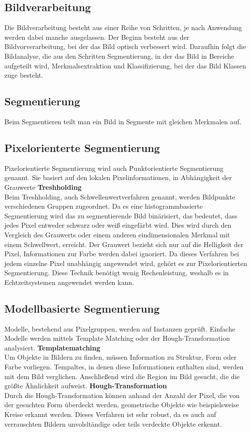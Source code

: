     \subsection*{Bildverarbeitung} 
    Die Bildverarbeitung besteht aus einer Reihe von Schritten, je nach Anwendung werden dabei manche ausgelassen.
    Der Beginn besteht aus der Bildvorverarbeitung, bei der das Bild optisch verbessert wird. Daraufhin folgt die Bildanalyse, die aus den Schritten Segmentierung, in der das Bild in Bereiche aufgeteilt wird, Merkmalsextraktion und Klassifizierung, bei der das Bild Klassen zuge besteht. \cite{Bildverarbeitung} \cite{Bildverarbeitung2}

    \subsection*{Segmentierung}
    Beim Segmentieren teilt man ein Bild in Segmente mit gleichen Merkmalen auf.

    \subsection*{Pixelorienterte Segmentierung} 
    Pixelorientierte Segmentierung wird auch Punktorientierte Segmentierung genannt. Sie basiert auf den lokalen Pixelinformationen, in Abhängigkeit der Grauwerte \cite{Seg_punkt}
    \textbf{Treshholding}\\ 
    Beim Treshholding, auch Schwellenwertverfahren genannt, werden Bildpunkte verschiedenen Gruppen zugeordnet. Da es eine histogrammbasierte Segmentierung wird das zu segmentierende Bild binärisiert, das bedeutet, dass jedes Pixel entweder schwarz oder weiß eingefärbt wird. Dies wird durch den Vergleich des Grauwerts oder einem anderen eindimensionalen Merkmal mit einem Schwellwert, erreicht. Der Grauwert bezieht sich nur auf die Helligkeit der Pixel, Informationen zur Farbe werden dabei ignoriert. Da dieses Verfahren bei jedem einzelne Pixel unabhängig angewendet wird, gehört es zur Pixelorientierten Segmentierung. Diese Technik benötigt wenig Rechenleistung, weshalb es in Echtzeitsystemen angewendet werden kann.

    \subsection*{Modellbasierte Segmentierung} 
    Modelle, bestehend aus Pixelgruppen, werden auf Instanzen geprüft. Einfache Modelle werden mittels Template Matching oder der Hough-Transformation analysiert. \cite{Seg_modell}
    \textbf{Templatematching}\\
    Um Objekte in Bildern zu finden, müssen Information zu Struktur, Form oder Farbe vorliegen. Tempaltes, in denen diese Informationen enthalten sind, werden mit dem Bild verglichen. Anschließend wird die Region im Bild gesucht, die die größte Ähnlichkeit aufweist.
    \textbf{Hough-Transformation}\\
    Durch die Hough-Transformation können anhand der Anzahl der Pixel, die von der gesuchten Form überdeckt werden, geometrische Objekte wie beispielsweise Kreise erkannt werden. Dieses Verfahren ist sehr robust, da es auch auf verrauschten Bildern unvolsltändige oder teils verdeckte Objekte erkennt.

